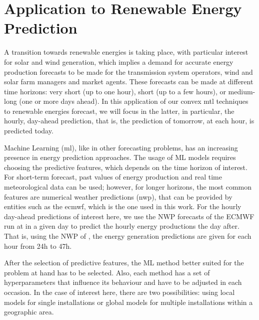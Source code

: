 \section{Application to Renewable Energy Prediction}\label{sec:convexmlt_renewable}

A transition towards renewable energies is taking place, with particular interest for solar and wind generation, which implies a demand for accurate energy production forecasts to be made for the transmission system operators, wind and solar farm managers and market agents. These forecasts can be made at different time horizons: very short (up to one hour), short (up to a few hours), or medium-long (one or more days ahead).
In this application of our convex \acrshort{mtl} techniques to renewable energies forecast, we will focus in the latter, in particular, the hourly, day-ahead prediction, that is, the prediction of tomorrow, at each hour, is predicted today.

Machine Learning (\acrshort{ml}), like in other forecasting problems, has an increasing presence in energy prediction approaches. 
The usage of ML models requires choosing the predictive features, which depends on the time horizon of interest. 
For short-term forecast, past values of energy production and real time meteorological data can be used; however, for longer horizons, the most common features are numerical weather predictions (\acrshort{nwp}), that can be provided by entities such as the \acrlong{ecmwf}, which is the one used in this work.
For the hourly day-ahead predictions of interest here, we use the NWP forecasts of the ECMWF run at  in a given day to predict the hourly energy productions the day after. That is, using the NWP of , the energy generation predictions are given for each hour from {24}h to {47}h.

After the selection of predictive features, the ML method better suited for the problem at hand has to be selected. Also, each method has a set of hyperparameters that influence its behaviour and have to be adjusted in each occasion.
In the case of interest here, there are two possibilities: using local models for single installations or global models for multiple installations within a geographic area.


